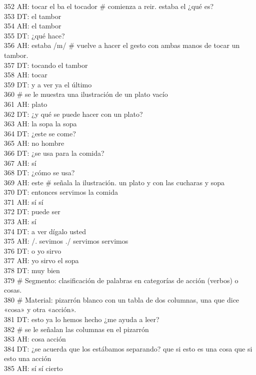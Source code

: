 352 AH: tocar el ba el tocador \# comienza a reir. estaba el ¿qué es?\\
353 DT: el tambor\\
354 AH: el tambor\\
355 DT: ¿qué hace?\\
356 AH: estaba /m/ \# vuelve a hacer el gesto con ambas manos de tocar un tambor.\\
357 DT: tocando el tambor\\
358 AH: tocar\\
359 DT: y a ver ya el último\\
360 \# se le muestra una ilustración de un plato vacío\\
361 AH: plato\\
362 DT: ¿y qué se puede hacer con un plato?\\
363 AH: la sopa la sopa\\
364 DT: ¿este se come?\\
365 AH: no hombre\\
366 DT: ¿se usa para la comida?\\
367 AH: sí\\
368 DT: ¿cómo se usa?\\
369 AH: este \# señala la ilustración. un plato y con las cucharas y sopa\\
370 DT: entonces servimos la comida\\
371 AH: sí sí\\
372 DT: puede ser\\
373 AH: sí\\
374 DT: a ver dígalo usted\\
375 AH: /. sevimos ./ servimos servimos\\
376 DT: o yo sirvo\\
377 AH: yo sirvo el sopa\\
378 DT: muy bien\\
379 \# Segmento: clasificación de palabras en categorías de acción (verbos) o cosas.\\
380 \# Material: pizarrón blanco con un tabla de dos columnas, una  que dice «cosa» y otra «acción».\\
381 DT: esto ya lo hemos hecho ¿me ayuda a leer?\\
382 \# se le señalan las columnas en el pizarrón\\
383 AH: cosa acción\\
384 DT: ¿se acuerda que los estábamos separando? que si esto es una cosa que si esto una acción\\
385 AH: sí sí cierto\\
